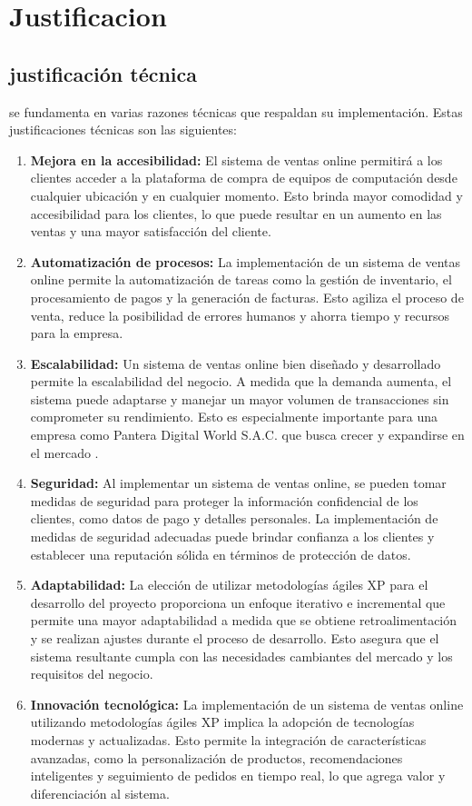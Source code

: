 \documentclass[12pt,a4paper]{article}
\newcommand{\newsection}[1]{\section{\hspace{4mm} #1}}%
\newcommand{\newsubsection}[1]{\subsection{\hspace{4mm} #1}}
\newcommand{\empresa}{Pantera Digital World S.A.C. }
\begin{document}
\newpage
\newsection{Justificacion}
\newsubsection{justificación técnica}
se fundamenta en varias razones técnicas que respaldan su implementación. Estas justificaciones técnicas son las siguientes:
\begin{enumerate}
\item \textbf{Mejora en la accesibilidad:} El sistema de ventas online permitirá a los clientes acceder a la plataforma de compra de equipos de computación desde cualquier ubicación y en cualquier momento. Esto brinda mayor comodidad y accesibilidad para los clientes, lo que puede resultar en un aumento en las ventas y una mayor satisfacción del cliente.
\item \textbf{Automatización de procesos:} La implementación de un sistema de ventas online permite la automatización de tareas como la gestión de inventario, el procesamiento de pagos y la generación de facturas. Esto agiliza el proceso de venta, reduce la posibilidad de errores humanos y ahorra tiempo y recursos para la empresa.
\item \textbf{Escalabilidad:} Un sistema de ventas online bien diseñado y desarrollado permite la escalabilidad del negocio. A medida que la demanda aumenta, el sistema puede adaptarse y manejar un mayor volumen de transacciones sin comprometer su rendimiento. Esto es especialmente importante para una empresa como \empresa que busca crecer y expandirse en el mercado .
\item \textbf{Seguridad:} Al implementar un sistema de ventas online, se pueden tomar medidas de seguridad para proteger la información confidencial de los clientes, como datos de pago y detalles personales. La implementación de medidas de seguridad adecuadas puede brindar confianza a los clientes y establecer una reputación sólida en términos de protección de datos.
\item \textbf{Adaptabilidad:} La elección de utilizar metodologías ágiles XP para el desarrollo del proyecto proporciona un enfoque iterativo e incremental que permite una mayor adaptabilidad a medida que se obtiene retroalimentación y se realizan ajustes durante el proceso de desarrollo. Esto asegura que el sistema resultante cumpla con las necesidades cambiantes del mercado y los requisitos del negocio.
\item \textbf{Innovación tecnológica:} La implementación de un sistema de ventas online utilizando metodologías ágiles XP implica la adopción de tecnologías modernas y actualizadas. Esto permite la integración de características avanzadas, como la personalización de productos, recomendaciones inteligentes y seguimiento de pedidos en tiempo real, lo que agrega valor y diferenciación al sistema.
\end{enumerate}
\end{document}

